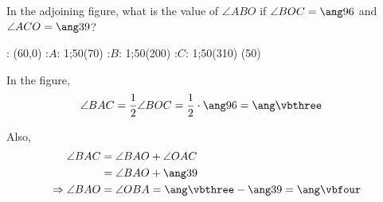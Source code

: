 


\DIVIDE{}\vbthree
\SUBTRACT\vbthree\vbtwo\vbfour

\question[2]  In the adjoining figure, what is the value of $\angle ABO$ if
$\angle BOC = \ang\vbone$ and $\angle ACO = \ang\vbtwo$?

\watchout

\ifprintanswers
\fi 
\begin{marginfigure}
		: (60,0)
    :$A$: 1;50(70)
    :$B$: 1;50(200)
    :$C$: 1;50(310)
	\figdrawbegin{}
		(50)
    \figdrawline [2,3,1,4,2]
    \ifprintanswers
      \figdrawline [1,2]
    \fi
	\figdrawend
  \centerline{\box\figBoxA}
\end{marginfigure}

\begin{solution}[\halfpage]
	In the figure, 
	\begin{align}
 		\angle BAC &= \dfrac{1}{2}\angle BOC = \dfrac{1}{2}\cdot\ang\vbone = \ang\vbthree
	\end{align}
	
	Also, 
	\begin{align}
		\angle BAC &= \angle BAO + \angle OAC \\
		           &= \angle BAO + \ang\vbtwo \\
		\Rightarrow \angle BAO &= \angle OBA = \ang\vbthree - \ang\vbtwo = \ang\vbfour
	\end{align}
\end{solution}
